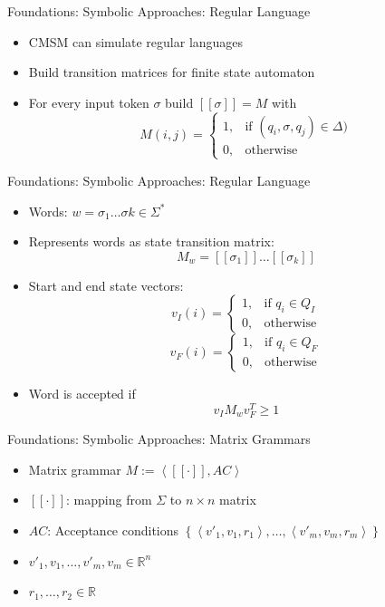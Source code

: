 \documentclass[12pt,a4paper]{beamer}
\newcommand{\tuple}[1]{\ensuremath{\left \langle #1 \right \rangle }}
\newcommand{\setof}[1]{\ensuremath{\left \{ #1 \right \}}}
\begin{document}
\begin{frame}{Foundations: Symbolic Approaches: Regular Language}
\begin{itemize}
\item CMSM can simulate regular languages
\item Build transition matrices for finite state automaton
\item For every input token $\sigma$ build $[[\sigma]] = M$ with
$$ M(i,j) = \left\{\begin{array}{cl} 1, & \mbox{if } (q_{i},\sigma,q_{j}) \in \Delta) \\ 0, & \mbox{otherwise} \end{array}\right.  $$
\end{itemize}
\end{frame}


\begin{frame}{Foundations: Symbolic Approaches: Regular Language}
\begin{itemize}
\item Words: $w = \sigma_{1} \ldots \sigma{k} \in \Sigma^{*}$ 
\item Represents words as state transition matrix:
$$ M_{w} = [[\sigma_{1}]]\ldots [[\sigma_{k}]]  $$
\item Start and end state vectors:
$$ v_{I}(i) = \left\{\begin{array}{cl} 1, & \mbox{if } q_{i} \in Q_{I} \\ 0, & \mbox{otherwise} \end{array}\right. $$ 
$$ v_{F}(i) = \left\{\begin{array}{cl} 1, & \mbox{if } q_{i} \in Q_{F} \\ 0, & \mbox{otherwise} \end{array}\right. $$
\item Word is accepted if
$$ v_{I}M_{w}v_{F}^{T} \ge 1 $$
\end{itemize}
\end{frame}



\begin{frame}{Foundations: Symbolic Approaches: Matrix Grammars}
\begin{itemize}
\item Matrix grammar $M := \tuple{[[\mathord{\cdot}]], AC}$
\item $[[\mathord{\cdot}]]$: mapping from $\Sigma$ to $n \times n $ matrix
\item $AC$: Acceptance conditions $ \setof{ \tuple{v'_{1}, v_{1}, r_{1}}, \ldots, \tuple{v'_{m}, v_{m}, r_{m}} }$
\item $v'_{1}, v_{1},\ldots,v'_{m}, v_{m} \in \mathbb{R}^{n}$
\item $r_{1}, \ldots, r_{2} \in \mathbb{R}$
\end{itemize}
\end{frame}
\end{document}
